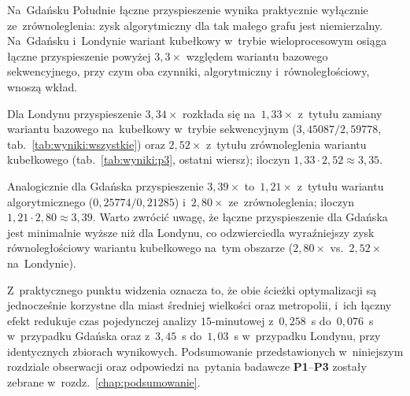 Na~Gdańsku Południe łączne przyspieszenie wynika praktycznie wyłącznie
ze~zrównoleglenia: zysk algorytmiczny dla tak małego grafu jest niemierzalny.
Na~Gdańsku i~Londynie wariant kubełkowy w~trybie wieloprocesowym osiąga
łączne przyspieszenie powyżej $3{,}3\times$ względem wariantu bazowego
sekwencyjnego, przy czym oba czynniki, algorytmiczny i~równoległościowy,
wnoszą wkład.

Dla Londynu przyspieszenie $3{,}34\times$ rozkłada się na~$1{,}33\times$
z~tytułu zamiany wariantu bazowego na~kubełkowy w~trybie sekwencyjnym
($3{,}45087/2{,}59778$, tab.~\ref{tab:wyniki:wszystkie}) oraz $2{,}52\times$
z~tytułu zrównoleglenia wariantu kubełkowego (tab.~\ref{tab:wyniki:p3},
ostatni wiersz); iloczyn $1{,}33\cdot 2{,}52\approx 3{,}35$.

\clearpage

Analogicznie dla Gdańska przyspieszenie $3{,}39\times$ to~$1{,}21\times$
z~tytułu wariantu algorytmicznego ($0{,}25774/0{,}21285$) i~$2{,}80\times$
ze~zrównoleglenia; iloczyn $1{,}21\cdot 2{,}80\approx 3{,}39$. Warto zwrócić
uwagę, że łączne przyspieszenie dla Gdańska jest minimalnie wyższe niż dla
Londynu, co odzwierciedla wyraźniejszy zysk równoległościowy wariantu
kubełkowego na~tym obszarze ($2{,}80\times$ vs.\ $2{,}52\times$ na~Londynie).

Z~praktycznego punktu widzenia oznacza to, że obie ścieżki optymalizacji
są jednocześnie korzystne dla miast średniej wielkości oraz metropolii,
i~ich łączny efekt redukuje czas pojedynczej analizy $15$-minutowej
z~$0{,}258$~s do~$0{,}076$~s w~przypadku Gdańska oraz z~$3{,}45$~s do~$1{,}03$~s
w~przypadku Londynu, przy identycznych zbiorach wynikowych. Podsumowanie
przedstawionych w~niniejszym rozdziale obserwacji oraz odpowiedzi
na~pytania badawcze \textbf{P1}--\textbf{P3} zostały zebrane
w~rozdz.~\ref{chap:podsumowanie}.

